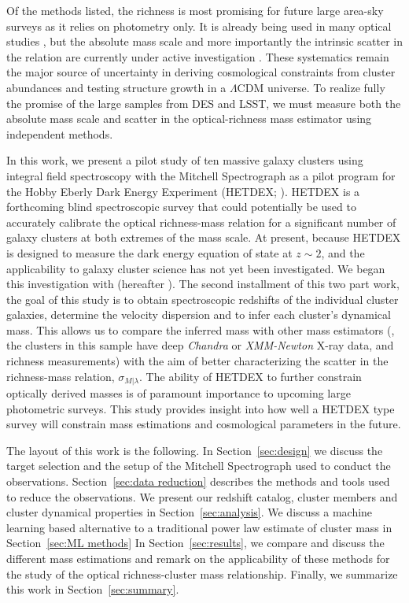 Of the methods listed, the richness is most promising for future large area-sky surveys as it relies on photometry only. It is already being used in many optical studies , but the absolute mass scale and more importantly the  intrinsic scatter in the relation are currently under active investigation . These systematics remain the major source of uncertainty in deriving cosmological constraints from cluster abundances and testing structure growth in a $\Lambda$CDM universe. To realize fully the promise of the large samples from DES and LSST, we must measure both the absolute mass scale and scatter in the optical-richness mass estimator using independent methods.

In this work, we present a pilot study of ten massive galaxy clusters using integral field spectroscopy with the Mitchell Spectrograph as a pilot program for the Hobby Eberly Dark Energy Experiment (HETDEX; \citealt{Hill2008}). HETDEX is a forthcoming blind spectroscopic survey that could potentially be used to accurately calibrate the optical richness-mass relation for a significant number of galaxy clusters at both extremes of the mass scale. At present, because HETDEX is designed to measure the dark energy equation of state at $z\sim2$, and the applicability to galaxy cluster science has not yet been investigated. We began this investigation with \cite{Boada2016} (hereafter ). The second installment of this two part work, the goal of this study is to obtain spectroscopic redshifts of the individual cluster galaxies, determine the velocity dispersion and to infer each cluster's dynamical mass. This allows us to compare the inferred mass with other mass estimators (\eg, the clusters in this sample have deep \textit{Chandra} or \textit{XMM-Newton} X-ray data, and richness measurements) with the aim of better characterizing the scatter in the richness-mass relation, $\sigma_{M|\lambda}$. The ability of HETDEX to further constrain optically derived masses is of paramount importance to upcoming large photometric surveys. This study provides insight into how well a HETDEX type survey will constrain mass estimations and cosmological parameters in the future.

The layout of this work is the following. In Section~\ref{sec:design} we discuss the target selection and the setup of the Mitchell Spectrograph used to conduct the observations. Section~\ref{sec:data reduction} describes the methods and tools used to reduce the observations. We present our redshift catalog, cluster members and cluster dynamical properties in Section~\ref{sec:analysis}. We discuss a machine learning based alternative to a traditional power law estimate of cluster mass in Section~\ref{sec:ML methods} In Section~\ref{sec:results}, we compare and discuss the different mass estimations and remark on the applicability of these methods for the study of the optical richness-cluster mass relationship.  Finally, we summarize this work in Section~\ref{sec:summary}.

